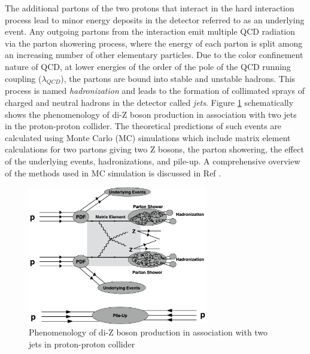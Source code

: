 The additional partons of the two protons that interact in the hard interaction process lead to minor energy deposits in the detector referred to as an underlying event. Any outgoing partons from the interaction emit multiple QCD radiation via the parton showering process, where the energy of each parton is split among an increasing number of other elementary particles. Due to the color confinement nature of QCD, at lower energies of the order of the pole of the QCD running coupling ($\lambda_{QCD}$), the partons are bound into stable and unstable hadrons. This process is named \textit{hadronization} and leads to the formation of collimated sprays of charged and neutral hadrons in the detector called \textit{jets}. Figure \ref{fig:ColliderPheno} schematically shows the phenomenology of di-Z boson production in association with two jets in the proton-proton collider. The theoretical predictions of such events are calculated using Monte Carlo (MC) simulations which include matrix element calculations for two partons giving two Z bosons, the parton showering, the effect of the underlying events, hadronizations, and pile-up. A comprehensive overview of the methods used in MC simulation is discussed in Ref \cite{EventGenerator}.  

\begin{figure}
\centering
    \includegraphics[width=0.7\textwidth] {figures/Theory/ColliderPheno.pdf}\hspace{1cm}
    \caption{Phenomenology of di-Z boson production in association with two jets in proton-proton collider}
\label{fig:ColliderPheno}
\end{figure}

